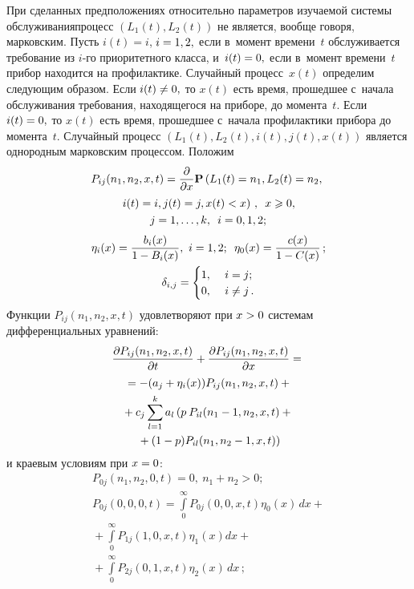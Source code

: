 \begin{multicols}{2}
При сделанных предположениях относительно параметров изучаемой
системы обслуживания\linebreak процесс $\left(L_1(t),L_2(t)\right)$ не
является, вообще говоря, марковским. Пусть $i(t)=i$, $i\hm=1,2,$ если
в~момент времени~$t$ обслуживается требование из $i$-го
приоритетного класса, и~$i(t)\hm=0,$ если в~момент времени~$t$ прибор
находится на профилактике. Случайный процесс~$x(t)$ определим
следующим образом. Если $i(t)\hm\ne 0,$ то $x(t)$ есть
время, прошедшее с~начала обслуживания требования, находящегося на
приборе, до момента~$t.$ Если $i(t)\hm=0,$ то $x(t)$ есть время,
прошедшее с~начала профилактики прибора до момента~$t.$ Случайный
процесс $\left(L_1(t),L_2(t),i(t),j(t),x(t)\right)$ является
однородным марковским процессом. Положим
\begin{multline*}
P_{ij}(n_1,n_2,x,t)=\displaystyle\frac{\displaystyle \partial\mathstrut}{\displaystyle \partial x\mathstrut}
\mathbf{P}\left(L_1(t)=n_1,L_2(t)=n_2,\right.\\
\left. i(t)=i,j(t)=j,x(t)<x
\vphantom{L_1}\right)\,,\enskip 
 x\geqslant 0,\\ 
 j=1,\ldots,k,\enskip i=0,1,2;
\end{multline*}
\begin{gather*}
\eta_i(x)=\displaystyle\frac{\displaystyle b_i(x)\mathstrut}{\displaystyle 1-B_i(x)\mathstrut},\ i=1,2;\enskip 
\eta_0(x)=\displaystyle\frac{\displaystyle c(x)\mathstrut}{\displaystyle 1-C(x)\mathstrut}\,;\\
\delta_{i,j}=\begin{cases}
1,&\ i=j;\\ 
0,&\ i\ne j\,.
\end{cases}
\end{gather*}
Функции $P_{ij}(n_1,n_2,x,t)$  удовлетворяют при $x\hm>0$
системам дифференциальных уравнений:
\begin{multline}
\label{3}
\displaystyle\frac{\displaystyle \partial P_{ij}(n_1,n_2,x,t)\mathstrut}{\displaystyle \partial t\mathstrut}+\displaystyle\frac{\displaystyle \partial
P_{ij}(n_1,n_2,x,t)\mathstrut}{\displaystyle \partial
x\mathstrut}={}\\
{}=-(a_j+\eta_i(x))P_{ij}(n_1,n_2,x,t)+ {}\\
{}+
c_j\sum\limits_{l=1}^ka_l\left(p\:P_{il}(n_1-1,n_2,x,t)+{}\right.\\
\left.{}+
(1-p)P_{il}(n_1,n_2-1,x,t)\right)
\end{multline}
и краевым условиям при $x\hm=0$:
\begin{multline}
\label{5}
P_{0j}(n_1,n_2,0,t)=0,\ n_1+n_2>0;\\
P_{0j}(0,0,0,t)=\int\limits_0^{\infty}P_{0j}(0,0,x,t)\eta_0(x)\,dx+{}\\
 {}+\int\limits_0^{\infty}P_{1j}(1,0,x,t)\eta_1(x)dx+{}\\
 {}+
\int\limits_0^{\infty}P_{2j}(0,1,x,t)\eta_2(x)\,dx\,;
\end{multline}


\end{multicols}
